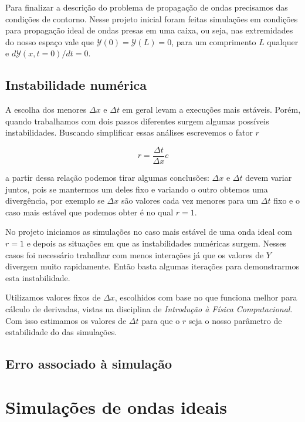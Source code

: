 \documentclass[a4paper, 11pt]{article}
\begin{document}
Para finalizar a descrição do problema de propagação de ondas precisamos das condições de
contorno. Nesse projeto inicial foram feitas simulações em condições para propagação ideal de ondas
presas em uma caixa, ou seja, nas extremidades do nosso espaço vale que $\mathcal{Y}(0) = \mathcal{Y}(L) = 0$, para um
comprimento $L$ qualquer e $d \mathcal{Y}(x, t = 0)/ dt = 0$. 


\subsection{Instabilidade numérica}
A escolha dos menores \( \Delta x \) e \( \Delta t \) em geral levam a execuções mais estáveis. Porém, quando
trabalhamos com dois passos diferentes surgem algumas possíveis instabilidades. Buscando simplificar
essas análises escrevemos o fator $r$

\begin{equation}
  r = \frac{\Delta t}{\Delta x} c
  \label{eq:fator_r}
\end{equation}

a partir dessa relação podemos tirar algumas conclusões: \( \Delta x \) e \( \Delta t \) devem variar juntos,
pois se mantermos um deles fixo e variando o outro obtemos uma divergência, por exemplo se \( \Delta x \)
são valores cada vez menores para um \( \Delta t \) fixo e o caso mais estável que podemos obter é no
qual \( r = 1  \).

No projeto iniciamos as simulações no caso mais estável de uma onda ideal com \( r = 1 \) e depois
as situações em que as instabilidades numéricas surgem. Nesses casos foi necessário trabalhar com
menos interações já que os valores de $Y$ divergem muito rapidamente. Então basta algumas iterações
para demonstrarmos esta instabilidade.


Utilizamos valores fixos de \( \Delta x \), escolhidos com base no que funciona melhor para cálculo de
derivadas, vistas na disciplina de \emph{Introdução à Física Computacional}. Com isso
estimamos os valores de \( \Delta t \) para que o \( r \) seja o nosso parâmetro de estabilidade do das simulações.


\subsection{Erro associado à simulação}


\section{Simulações de ondas ideais}
\end{document}
